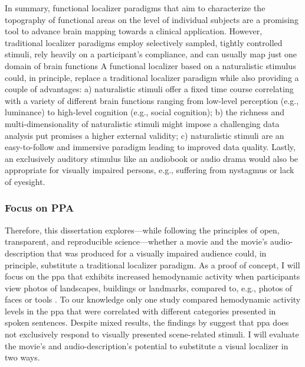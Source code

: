In summary, functional localizer paradigms that aim to characterize the
topography of functional areas on the level of individual subjects are a
promising tool to advance brain mapping towards a clinical application.
However, traditional localizer paradigms employ selectively sampled, tightly
controlled stimuli, rely heavily on a participant's compliance, and can usually
map just one domain of brain functions
A functional localizer based on a naturalistic stimulus could, in principle,
replace a traditional localizer paradigm while also providing a couple of
advantages:
a) naturalistic stimuli offer a fixed time course correlating with a variety of
different brain functions ranging from low-level perception (e.g., luminance) to
high-level cognition (e.g., social cognition);
b) the richness and multi-dimensionality of naturalistic stimuli might impose a
challenging data analysis put promises a higher external validity;
c) naturalistic stimuli are an easy-to-follow and immersive paradigm leading to
improved data quality.
Lastly, an exclusively auditory stimulus like an audiobook or audio drama would
also be appropriate for visually impaired persons, e.g., suffering from
nystagmus or lack of eyesight.


\subsubsection{Focus on PPA}



Therefore, this dissertation explores---while following the principles of
open, transparent, and reproducible science---whether a movie and the movie's
audio-description that was produced for a visually impaired audience could, in
principle, substitute a traditional localizer paradigm.
As a proof of concept, I will focus on the \ac{ppa} that exhibits increased
hemodynamic activity when participants view photos of landscapes, buildings or
landmarks, compared to, e.g., photos of faces or tools \citep[e.g.,][for
reviews]{epstein2014neural, aminoff2013role}.
To our knowledge only one study \citep[cf.][]{aziz2008modulation} compared
hemodynamic activity levels in the \ac{ppa} that were correlated with different
categories presented in spoken sentences.
%
Despite mixed results, the findings by \citet{aziz2008modulation} suggest that
\ac{ppa} does not exclusively respond to visually presented scene-related
stimuli.
%
I will evaluate the movie's and audio-description's potential to substitute a
visual localizer in two ways.

